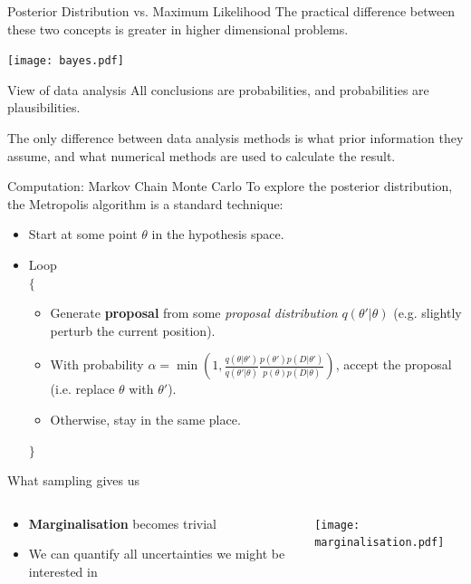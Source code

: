 \begin{frame}[t]{Posterior Distribution vs. Maximum Likelihood}
The practical difference between these two concepts is greater in higher
dimensional problems.
\begin{center}
\texttt{[image: bayes.pdf]}
\end{center}
\end{frame}


\begin{frame}[t]{View of data analysis}
All conclusions are probabilities, and probabilities are plausibilities.
\vspace{20pt}

The only difference between data analysis methods is what prior information
they assume, and what numerical methods are used to calculate the result.
\end{frame}

\begin{frame}[t]{Computation: Markov Chain Monte Carlo}
To explore the posterior distribution, the Metropolis algorithm is a standard
technique:

\begin{itemize}
\item Start at some point $\theta$ in the hypothesis space.
\item Loop\\
$\{$
  \begin{itemize}
  \item Generate {\bf proposal} from some {\it proposal distribution} $q(\theta' | \theta)$
  (e.g. slightly perturb the current position).
  \item With probability $\alpha = \min\left(1, \frac{q(\theta | \theta')}{q(\theta' | \theta)}\frac{p(\theta')p(D|\theta')}{p(\theta)p(D|\theta)}\right)$, accept the proposal (i.e. replace $\theta$ with $\theta'$).
  \item Otherwise, stay in the same place.
  \end{itemize}
$\}$
\end{itemize}
\end{frame}


\begin{frame}[t]{What sampling gives us}
\begin{columns}[T]
\begin{column}{0.35\textwidth}
  \vspace{30pt}
  \begin{itemize}
  \setlength{\itemsep}{20pt}
  \item {\bf Marginalisation} becomes trivial
  \item We can quantify all uncertainties we might be interested in
  \end{itemize}
\end{column}
\hfill
\begin{column}{0.5\textwidth}
  \hspace{-30pt}
  \texttt{[image: marginalisation.pdf]}
\end{column}

\end{columns}
\end{frame}

